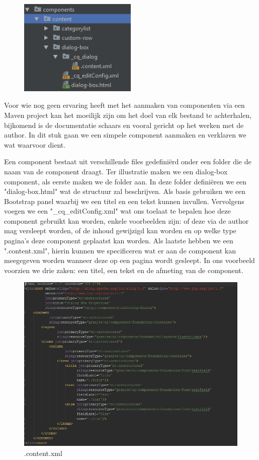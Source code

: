 \documentclass{article}
\begin{document}
	\begin{figure}
  		\includegraphics[width=0.5\textwidth]{images/component-pck-structure.PNG}
	\end{figure}
	Voor wie nog geen ervaring heeft met het aanmaken van componenten via een Maven project kan het moeilijk zijn om het doel van elk bestand te achterhalen, bijkomend is de documentatie schaars en vooral gericht op het werken met de author. In dit stuk gaan we een simpele component aanmaken en verklaren we wat waarvoor dient.
	\par
	Een component bestaat uit verschillende files gedefini\"erd onder een folder die de naam van de component draagt. Ter illustratie maken we een dialog-box component, als eerste maken we de folder aan. In deze folder defini\"eren we een "dialog-box.html" wat de structuur zal beschrijven. Als basis gebruiken we een Bootstrap panel waarbij we een titel en een tekst kunnen invullen. Vervolgens voegen we een "\_cq\_editConfig.xml" wat ons toelaat te bepalen hoe deze component gebruikt kan worden, enkele voorbeelden zijn: of deze via de author mag versleept worden, of de inhoud gewijzigd kan worden en op welke type pagina's deze component geplaatst kan worden. Als laatste hebben we een ".content.xml", hierin kunnen we specificeren wat er aan de component kan meegegeven worden wanneer deze op een pagina wordt gesleept. In ons voorbeeld voorzien we drie zaken: een titel, een tekst en de afmeting van de component.
	\begin{figure}[h!]
  		\includegraphics[width=\linewidth]{images/content-xml.PNG}
  		\caption{.content.xml}
  	\end{figure}
\end{document}
